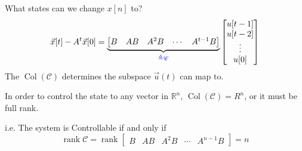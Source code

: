 \begin{frame}{What states can we change \(x[n]\) to?}
    \[
        \vec x[t] - A^t \vec x[0] =
        \underbrace{\begin{bmatrix}
            B & AB & A^2 B & \cdots & A^{t - 1} B
        \end{bmatrix}}_{\color{blue}\triangleq \mathscr{C}}
        \begin{bmatrix}
            u[t - 1] \\
            u[t - 2] \\
            \vdots \\
            u[0] \\
        \end{bmatrix}
    \]
    \providecommand{\Col}{\operatorname{Col}}
    \providecommand{\rank}{\operatorname{rank}}
    The \(\Col(\mathscr{C})\) determines the subspace \(\vec u(t)\) can map to.

    In order to control the state to any vector in \(\mathbb R^n\), \(\Col(\mathscr{C}) = R^n\), or it must be full rank.

    i.e. The system is Controllable if and only if
    \[
        \rank{\mathscr{C}} = \rank\begin{bmatrix}
            B & AB & A^2 B & \cdots & A^{n - 1} B
        \end{bmatrix} = n
    \]

\end{frame}
